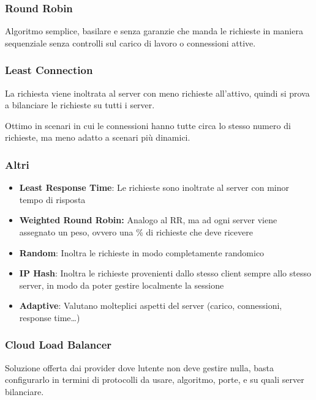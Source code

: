 \subsubsection{Round Robin}\label{round-robin}

Algoritmo semplice, basilare e senza garanzie che manda le richieste in
maniera sequenziale senza controlli sul carico di lavoro o connessioni
attive.

\subsubsection{Least Connection}\label{least-connection}

La richiesta viene inoltrata al server con meno richieste all'attivo,
quindi si prova a bilanciare le richieste su tutti i server.

Ottimo in scenari in cui le connessioni hanno tutte circa lo stesso
numero di richieste, ma meno adatto a scenari più dinamici.

\subsubsection{Altri}\label{altri}

\begin{itemize}
\item
  \textbf{Least Response Time}: Le richieste sono inoltrate al server
  con minor tempo di risposta
\item
  \textbf{Weighted Round Robin:} Analogo al RR, ma ad ogni server viene
  assegnato un peso, ovvero una \% di richieste che deve ricevere
\item
  \textbf{Random}: Inoltra le richieste in modo completamente randomico
\item
  \textbf{IP Hash}: Inoltra le richieste provenienti dallo stesso client
  sempre allo stesso server, in modo da poter gestire localmente la
  sessione
\item
  \textbf{Adaptive}: Valutano molteplici aspetti del server (carico,
  connessioni, response time\ldots)
\end{itemize}

\subsubsection{Cloud Load Balancer}\label{cloud-load-balancer}

Soluzione offerta dai provider dove l\textquotesingle utente non deve
gestire nulla, basta configurarlo in termini di protocolli da usare,
algoritmo, porte, e su quali server bilanciare.

